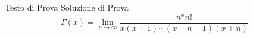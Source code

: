 \documentclass[../main.tex]{subfiles}
\begin{document}
{
Testo di Prova
}
{
Soluzione di Prova
$$\Gamma(x)=\lim_{n\to\infty} \dfrac{n^xn!}{x(x+1)\cdots (x+n-1)(x+n)}$$
}
\end{document}
